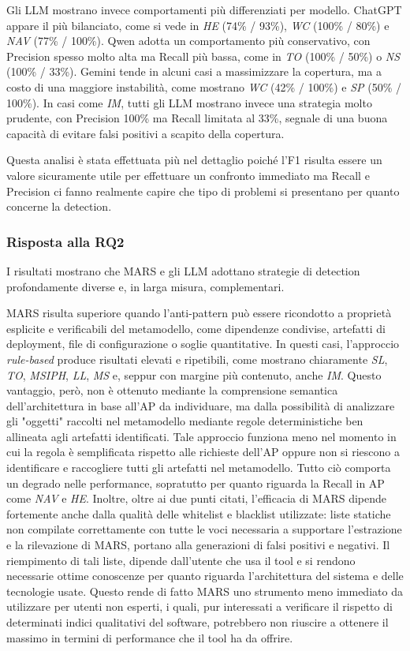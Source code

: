 Gli LLM mostrano invece comportamenti più differenziati per modello. ChatGPT appare il più bilanciato, come si vede in \textit{HE} (74\% / 93\%), \textit{WC} (100\% / 80\%) e \textit{NAV} (77\% / 100\%). Qwen adotta un comportamento più conservativo, con Precision spesso molto alta ma Recall più bassa, come in \textit{TO} (100\% / 50\%) o \textit{NS} (100\% / 33\%). Gemini tende in alcuni casi a massimizzare la copertura, ma a costo di una maggiore instabilità, come mostrano \textit{WC} (42\% / 100\%) e \textit{SP} (50\% / 100\%). In casi come \textit{IM}, tutti gli LLM mostrano invece una strategia molto prudente, con Precision 100\% ma Recall limitata al 33\%, segnale di una buona capacità di evitare falsi positivi a scapito della copertura.

Questa analisi è stata effettuata più nel dettaglio poiché l'F1 risulta essere un valore sicuramente utile per effettuare un confronto immediato ma Recall e Precision ci fanno realmente capire che tipo di problemi si presentano per quanto concerne la detection.

\subsubsection*{Risposta alla RQ2}

I risultati mostrano che MARS e gli LLM adottano strategie di detection profondamente diverse e, in larga misura, complementari.

MARS risulta superiore quando l’anti-pattern può essere ricondotto a proprietà esplicite e verificabili del metamodello, come dipendenze condivise, artefatti di deployment, file di configurazione o soglie quantitative. In questi casi, l’approccio \textit{rule-based} produce risultati elevati e ripetibili, come mostrano chiaramente \textit{SL}, \textit{TO}, \textit{MSIPH}, \textit{LL}, \textit{MS} e, seppur con margine più contenuto, anche \textit{IM}. Questo vantaggio, però, non è ottenuto mediante la comprensione semantica dell'architettura in base all'AP da individuare, ma dalla possibilità di analizzare gli "oggetti" raccolti nel metamodello mediante regole deterministiche ben allineata agli artefatti identificati. Tale approccio funziona meno nel momento in cui la regola è semplificata rispetto alle richieste dell'AP oppure non si riescono a identificare e raccogliere tutti gli artefatti nel metamodello. Tutto ciò comporta un degrado nelle performance, sopratutto per quanto riguarda la Recall in AP come \textit{NAV} e \textit{HE}. Inoltre, oltre ai due punti citati, l’efficacia di MARS dipende fortemente anche dalla qualità delle whitelist e blacklist utilizzate: liste statiche non compilate correttamente con tutte le voci necessaria a supportare l'estrazione e la rilevazione di MARS, portano alla generazioni di falsi positivi e negativi. Il riempimento di tali liste, dipende dall'utente che usa il tool e si rendono necessarie ottime conoscenze per quanto riguarda l'architettura del sistema e delle tecnologie usate. Questo rende di fatto MARS uno strumento meno immediato da utilizzare per utenti non esperti, i quali, pur interessati a verificare il rispetto di determinati indici qualitativi del software, potrebbero non riuscire a ottenere il massimo in termini di performance che il tool ha da offrire.

